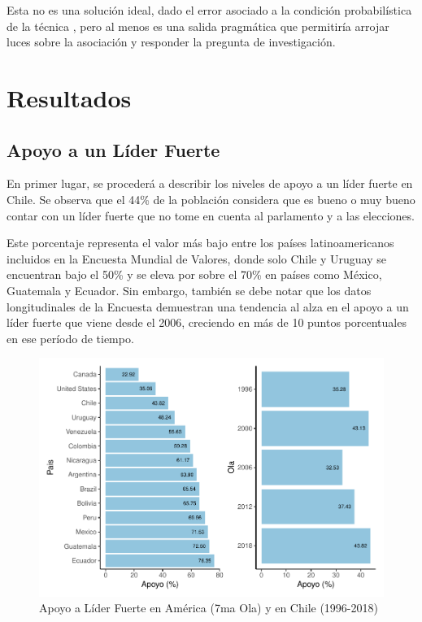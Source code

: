 \documentclass[12pt,twoside]{templates/facsothesis}
\begin{document}
Esta no es una solución ideal, dado el error asociado a la condición probabilística de la técnica \citep{collins2010}, pero al menos es una salida pragmática que permitiría arrojar luces sobre la asociación y responder la pregunta de investigación.

\hypertarget{resultados}{%
\chapter{Resultados}\label{resultados}}

\hypertarget{apoyo-a-un-luxedder-fuerte-1}{%
\section{Apoyo a un Líder Fuerte}\label{apoyo-a-un-luxedder-fuerte-1}}

En primer lugar, se procederá a describir los niveles de apoyo a un líder fuerte en Chile. Se observa que el 44\% de la población considera que es bueno o muy bueno contar con un líder fuerte que no tome en cuenta al parlamento y a las elecciones.

Este porcentaje representa el valor más bajo entre los países latinoamericanos incluidos en la Encuesta Mundial de Valores, donde solo Chile y Uruguay se encuentran bajo el 50\% y se eleva por sobre el 70\% en países como México, Guatemala y Ecuador. Sin embargo, también se debe notar que los datos longitudinales de la Encuesta demuestran una tendencia al alza en el apoyo a un líder fuerte que viene desde el 2006, creciendo en más de 10 puntos porcentuales en ese período de tiempo.

\begin{figure}[!ht]
\includegraphics[width=1\linewidth,]{tesis_files/figure-latex/unnamed-chunk-5-1} \caption{Apoyo a Líder Fuerte en América (7ma Ola) y en Chile (1996-2018)}\label{fig:unnamed-chunk-5}
\end{figure}
\end{document}
